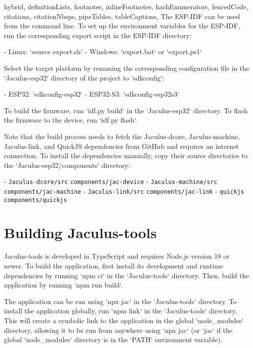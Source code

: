 \begin{markdown*}{%
  hybrid,
  definitionLists,
  footnotes,
  inlineFootnotes,
  hashEnumerators,
  fencedCode,
  citations,
  citationNbsps,
  pipeTables,
  tableCaptions,
}
The ESP-IDF can be used from the command line. To set up the environment variables for the ESP-IDF, run the corresponding export script in the ESP-IDF directory:

- Linux: `source export.sh`
- Windows: `export.bat` or `export.ps1`

Select the target platform by renaming the corresponding configuration file in the `Jaculus-esp32` directory of the project to `sdkconfig`:

- ESP32: `sdkconfig-esp32`
- ESP32-S3: `sdkconfig-esp32s3`

To build the firmware, run `idf.py build` in the `Jaculus-esp32` directory. To flash the firmware to the device, run `idf.py flash`.

Note that the build process needs to fetch the Jaculus-dcore, Jaculus-machine, Jaculus-link, and QuickJS dependencies from GitHub and requires an internet connection. To install the dependencies manually, copy their source directories to the `Jaculus-esp32/components` directory:

- \texttt{Jaculus-dcore/src} \rightarrow \texttt{components/jac-device}
- \texttt{Jaculus-machine/src} \rightarrow \texttt{components/jac-machine}
- \texttt{Jaculus-link/src} \rightarrow \texttt{components/jac-link}
- \texttt{quickjs} \rightarrow \texttt{components/quickjs}


\chapter{Building Jaculus-tools}

Jaculus-tools is developed in TypeScript and requires Node.js version 18 or newer. To build the application, first install its development and runtime dependencies by running `npm ci` in the `Jaculus-tools` directory. Then, build the application by running `npm run build`.

The application can be run using `npx jac` in the `Jaculus-tools` directory. To install the application globally, run `npm link` in the `Jaculus-tools` directory. This will create a symbolic link to the application in the global `node_modules` directory, allowing it to be run from anywhere using `npx jac` (or `jac` if the global `node_modules` directory is in the `PATH` environment variable).


\end{markdown*}
